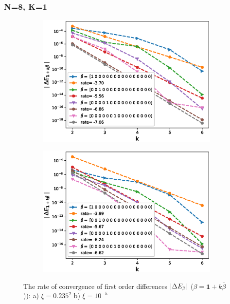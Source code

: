 \documentclass[11pt]{article}
\begin{document}
\newpage
\subsubsection*{N=8, K=1 }


\begin{figure}[h!]
\centering
\begin{subfigure}{.5\textwidth}
\centering
\includegraphics[width=1\linewidth]{./figures/effect_rho_differences/H_0_43_K_1/N_8/first_difference_rbergomi_8steps_H_043_K_1_rho__0_9_with_rate_W1.eps}
\caption{}
\label{fig:sub3}
\end{subfigure}%
\begin{subfigure}{.5\textwidth}
\centering
\includegraphics[width=1\linewidth]{./figures/effect_xi_differences/H_0_43_K_1/N_8/first_difference_rbergomi_8steps_H_043_K_1_xi_10__5_with_rate_W1.eps}
\caption{}
\label{fig:sub4}
\end{subfigure}

\caption{The rate of convergence of  first order differences $\left\lvert\Delta E_{\beta}\right\rvert$ ($\beta=\mathbf{1}+k \bar{\beta}$)): a) $\xi=0.235^2$ b)  $\xi=10^{-5}$}
\label{fig:test2}
\end{figure}
\end{document}
